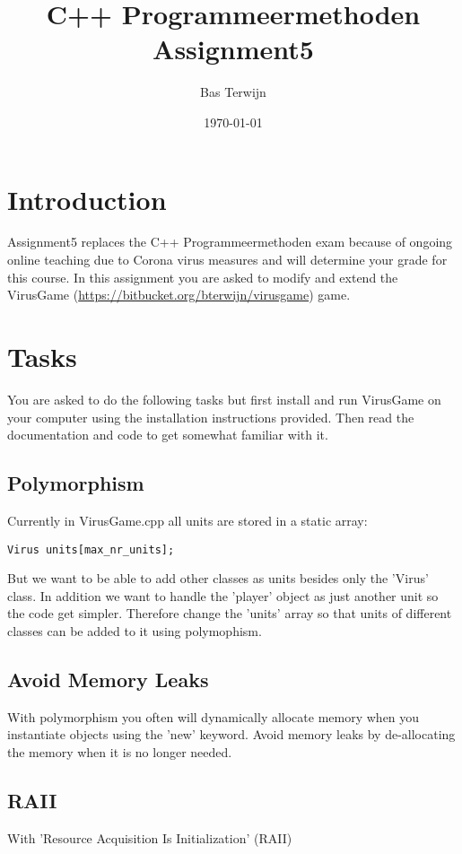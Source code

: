 \documentclass[12pt]{article}
\title{C++ Programmeermethoden Assignment5}
\author{Bas Terwijn}
\date{\today}
\begin{document}
\maketitle

\section{Introduction}
Assignment5 replaces the C++ Programmeermethoden exam because of
ongoing online teaching due to Corona virus measures and will
determine your grade for this course. In this assignment you are asked
to modify and extend the VirusGame
(\url{https://bitbucket.org/bterwijn/virusgame}) game.

\section{Tasks}
You are asked to do the following tasks but first install and run
VirusGame on your computer using the installation instructions
provided. Then read the documentation and code to get somewhat
familiar with it.

\subsection{Polymorphism}
Currently in VirusGame.cpp all units are stored in a static array:

\begin{tcolorbox}
\begin{verbatim}
Virus units[max_nr_units];
\end{verbatim}
\end{tcolorbox}

But we want to be able to add other classes as units besides only the
'Virus' class. In addition we want to handle the 'player' object as
just another unit so the code get simpler. Therefore change the
'units' array so that units of different classes can be added to it
using polymophism.

\subsection{Avoid Memory Leaks}
With polymorphism you often will dynamically allocate memory when you
instantiate objects using the 'new' keyword. Avoid memory leaks by
de-allocating the memory when it is no longer needed.

\subsection{RAII}
With 'Resource Acquisition Is Initialization' (RAII)
\end{document}
